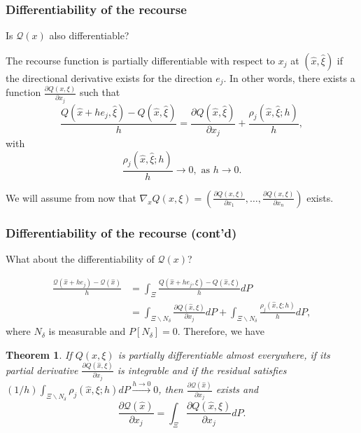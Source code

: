 \documentclass[aspectratio=169]{beamer}
\newtheorem{theo}{Theorem}
\begin{document}
\begin{frame}
\frametitle{Differentiability of the recourse}

Is $\mathcal{Q}(x)$ also differentiable?

\mbox{}

The recourse function is partially differentiable with respect to $x_j$ at $(\hat{x}, \hat{\xi})$ if the directional derivative exists for the direction $e_j$.
In other words, there exists a function $\frac{\partial Q(x,\xi)}{\partial x_j}$ such that
\[
\frac{Q(\hat{x}+he_j,\hat{\xi}) - Q(\hat{x},\hat{\xi})}{h} =
\frac{\partial Q(\hat{x},\hat{\xi})}{\partial x_j} + \frac{\rho_j (\hat{x},
  \hat{\xi}; h)}{h},
\]
with
\[
\frac{\rho_j (\hat{x}, \hat{\xi}; h)}{h} \rightarrow 0, \mbox{ as } h\rightarrow 0.
\]

\mbox{}

We will assume from now that $\nabla_x Q(x, \xi) = \left( \frac{\partial
  Q(x,\xi)}{\partial x_1},\ldots, \frac{\partial
  Q(x,\xi)}{\partial x_n} \right)$ exists.

\end{frame}

\begin{frame}
\frametitle{Differentiability of the recourse (cont'd)}
\small

What about the differentiability of $\mathcal{Q}(x)$?

\begin{align*}
\frac{\mathcal{Q}(\hat{x}+he_j) -
  \mathcal{Q}(\hat{x})}{h} &=
\int_{\Xi}
\frac{Q(\hat{x}+he_j,\xi) - Q(\hat{x},\xi)}{h} dP \\
&= \int_{\Xi \backslash N_{\delta}} \frac{\partial
  Q(\hat{x},\xi)}{\partial x_j} dP+ \int_{\Xi \backslash N_{\delta}}
\frac{\rho_j (\hat{x}, \xi; h)}{h} dP,
\end{align*}
where $N_{\delta}$ is measurable and $P[N_{\delta}] = 0$.
Therefore, we have
\begin{theo}
If $Q(x,\xi)$ is partially differentiable almost everywhere, if its partial derivative 
$\frac{\partial Q(\hat{x},\xi)}{\partial x_j}$ is integrable and if the residual satisfies
$(1/h) \int_{\Xi \backslash N_{\delta}} \rho_j (\hat{x}, \xi; h) dP \overset{h \rightarrow 0}{\rightarrow } 0$, then $\frac{\partial \mathcal{Q}(\hat{x})}{\partial x_j}$ exists and
\[
 \frac{\partial \mathcal{Q}(\hat{x})}{\partial x_j} =
 \int_{\Xi} \frac{\partial Q(\hat{x},\xi)}{\partial x_j} dP.
\]
\end{theo}

\end{frame}
\end{document}
